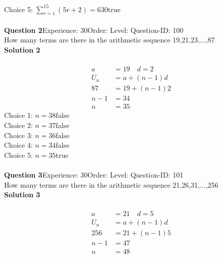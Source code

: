 \documentclass{article}
\begin{document}
Choice 5: \hspace{20pt}$\displaystyle\sum_{r=1}^{15} (5r+2)=630$\hspace{20pt}true\\
\\[4pt]
\noindent\textbf{Question 2}\hspace{20pt}Experience: 30\hspace{20pt}Order: \hspace{20pt}Level: \hspace{20pt}Question-ID: 100\\[2pt]
How many terms are there in the arithmetic sequence 19,21,23,...,87\\[4pt]
\noindent\textbf{Solution 2}\\[2pt]
\\[-35pt]\begin{align*}
a&=19 \quad d=2\\[2pt]
U_n&=a+(n-1)d\\[2pt]
87&=19+(n-1)2\\[2pt]
n-1&=34\\[2pt]
n&=35
\end{align*}
Choice 1: \hspace{20pt}$n=38$\hspace{20pt}false\\
Choice 2: \hspace{20pt}$n=37$\hspace{20pt}false\\
Choice 3: \hspace{20pt}$n=36$\hspace{20pt}false\\
Choice 4: \hspace{20pt}$n=34$\hspace{20pt}false\\
Choice 5: \hspace{20pt}$n=35$\hspace{20pt}true\\
\\[4pt]
\noindent\textbf{Question 3}\hspace{20pt}Experience: 30\hspace{20pt}Order: \hspace{20pt}Level: \hspace{20pt}Question-ID: 101\\[2pt]
How many terms are there in the arithmetic sequence 21,26,31,...,256\\[4pt]
\noindent\textbf{Solution 3}\\[2pt]
\\[-35pt]\begin{align*}
a&=21 \quad d=5\\[2pt]
U_n&=a+(n-1)d\\[2pt]
256&=21+(n-1)5\\[2pt]
n-1&=47\\[2pt]
n&=48
\end{align*}
\end{document}
